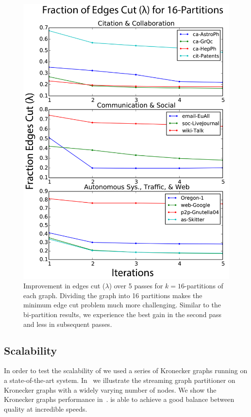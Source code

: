 \begin{figure}[t!]
\centering
\includegraphics[width=0.9\columnwidth] {figures/real_k16_lambda.pdf}
\caption[Caption for]{Improvement in edges cut ($\lambda$) over 5 passes for $k=16$-partitions of each graph. Dividing the graph into 16 partitions makes the minimum edge cut problem much more challenging. Similar to the bi-partition results, we experience the best gain in the second pass and less in subsequent passes.}
\label{fig:k16_lambda}
\end{figure}


\subsection{Scalability}
In order to test the scalability of \ourmethod we used a series of Kronecker graphs running on a state-of-the-art system.
In~ we illustrate the streaming graph partitioner on Kronecker graphs with a widely varying number of nodes.
We show the Kronecker graphs performance in~. 
\ourmethod is able to achieve a good balance between quality at incredible speeds.

